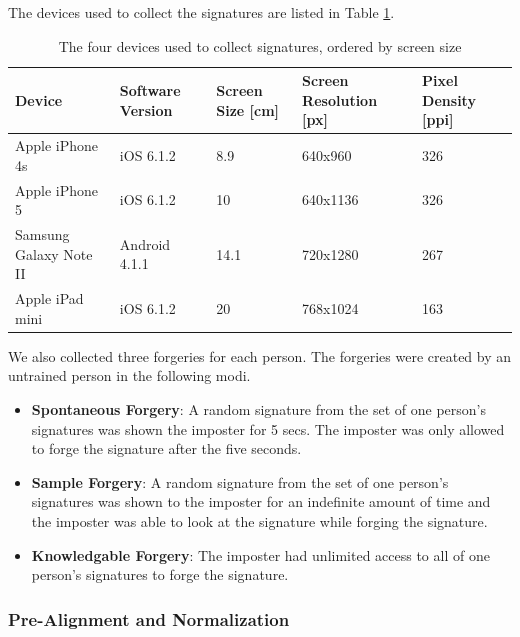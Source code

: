\documentclass[a4paper, oneside]{csthesis}
\begin{document}
The devices used to collect the signatures are listed in Table \ref{tbl:signatures-devices}.

\begin{table}[tb]
    \begin{center}
        \begin{tabular}{p{1.75cm}|p{2cm}p{2cm}p{2cm}p{2cm}}
        \hline

        \hline
        \textbf{Device} & \textbf{Software Version} & \textbf{Screen Size [cm]} & \textbf{Screen Resolution [px]} & \textbf{Pixel Density [ppi]} \\
        \hline
        Apple iPhone 4s & iOS 6.1.2 & 8.9 & 640x960 & 326 \\
        \hdashline[0.5pt/3pt]
        Apple iPhone 5 & iOS 6.1.2 & 10 & 640x1136 & 326 \\
        \hdashline[0.5pt/3pt]
        Samsung Galaxy Note II & Android 4.1.1 & 14.1 & 720x1280 & 267 \\
        \hdashline[0.5pt/3pt]
        Apple iPad mini & iOS 6.1.2 & 20 & 768x1024 & 163\\
        \hline
        \end{tabular}
    \end{center}
    \label{tbl:signatures-devices}
    \caption{The four devices used to collect signatures, ordered by screen size}
\end{table}

We also collected three forgeries for each person. The forgeries were created by an untrained person in the following modi.

\begin{itemize}
\item \textbf{Spontaneous Forgery}: A random signature from the set of one person's signatures was shown the imposter for 5 secs. The imposter was only allowed to forge the signature after the five seconds.
\item \textbf{Sample Forgery}: A random signature from the set of one person's signatures was shown to the imposter for an indefinite amount of time and the imposter was able to look at the signature while forging the signature.
\item \textbf{Knowledgable Forgery}: The imposter had unlimited access to all of one person's signatures to forge the signature.
\end{itemize}

\subsubsection{Pre-Alignment and Normalization}
\end{document}
